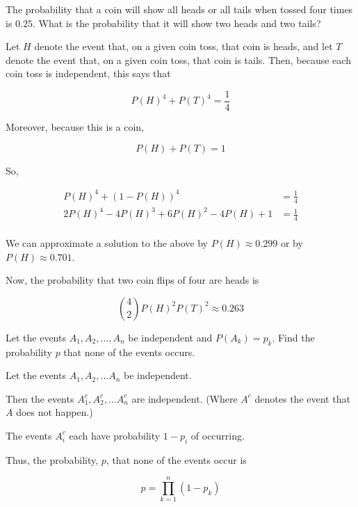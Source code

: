 \begin{problem}[Handout 5, \# 12]
  The probability that a coin will show all heads or all tails when tossed
  four times is \(0.25\). What is the probability that it will show two
  heads and two tails?
\end{problem}
\begin{solution}
Let $H$ denote the event that, on a given coin toss, that coin is heads, and let $T$ denote the event that, on a given coin toss, that coin is tails. Then, because each coin toss is independent, this says that

\[
P(H)^4 + P(T)^4 = \frac{1}{4}
\]

Moreover, because this is a coin,

\[
P(H) + P(T) = 1
\]

So,

\begin{align*}
P(H)^4 + (1-P(H))^4 &= \frac{1}{4} \\
2P(H)^4 -4P(H)^3 + 6P(H)^2 - 4P(H) +1 &= \frac{1}{4} \\
\end{align*}

We can approximate a solution to the above by $P(H) \approx 0.299$ or by $P(H) \approx 0.701$.

Now, the probability that two coin flips of four are heads is

\[
\binom{4}{2}P(H)^2P(T)^2 \approx 0.263
\]

\end{solution}
\newpage

\begin{problem}[Handout 5, \# 13]
  Let the events \(A_1, A_2,\dotsc,A_n\) be independent and
  \(P(A_k)=p_k\). Find the probability \(p\) that none of the events
  occurs.
\end{problem}
\begin{solution}

Let the events $A_1, A_2, \ldots A_n$ be independent.

Then the events $A_1^c, A_2^c, \ldots A_n^c$ are independent. (Where $A^c$ denotes the event that $A$ does not happen.)

The events $A_i^c$ each have probability $1-p_i$ of occurring.

Thus, the probability, $p$, that none of the events occur is

\[

p = \prod\limits_{k=1}^n (1-p_k)


\]
\end{solution}
\newpage


